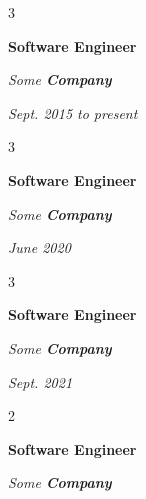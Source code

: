 \documentclass[10pt, letterpaper]{article}
\newenvironment{onecolentrybulleted}{
    \onecolentry
    \setcolumnwidth{0.6 cm, \fill}
    \begin{paracol}{2}
    \vspace*{\fill}
    \textbullet
    \vspace*{3px}
    \vspace*{\fill}
    \switchcolumn
}{
    \end{paracol}
    \endonecolentry
} %
\newenvironment{threecolentry}[3][]{
    \onecolentry
    \def\thirdColumn{#3}
    \setcolumnwidth{0.6 cm, \fill, 4.5 cm}
    \begin{paracol}{3}
    #2 \switchcolumn
}{
    \switchcolumn \raggedleft \thirdColumn
    \end{paracol}
    \endonecolentry
} %
\begin{document}
        \vspace{0.2 cm-3px}

        \begin{threecolentry}{
            \vspace*{\fill}
            \textbullet
            \vspace*{3px}
            \vspace*{\fill}
        }{
            
            
        \textit{Sept. 2015 to present}}
            \textbf{Software Engineer}
            
            \textit{Some \textbf{Company}}
        \end{threecolentry}



        \vspace{0.2 cm-3px}

        \begin{threecolentry}{
            \vspace*{\fill}
            \textbullet
            \vspace*{3px}
            \vspace*{\fill}
        }{
            
            
        \textit{June 2020}}
            \textbf{Software Engineer}
            
            \textit{Some \textbf{Company}}
        \end{threecolentry}



        \vspace{0.2 cm-3px}

        \begin{threecolentry}{
            \vspace*{\fill}
            \textbullet
            \vspace*{3px}
            \vspace*{\fill}
        }{
            
            
        \textit{Sept. 2021}}
            \textbf{Software Engineer}
            
            \textit{Some \textbf{Company}}
        \end{threecolentry}



        \vspace{0.2 cm-3px}

        \begin{onecolentrybulleted}
            \textbf{Software Engineer}
            
            \textit{Some \textbf{Company}}
        \end{onecolentrybulleted}
\end{document}
